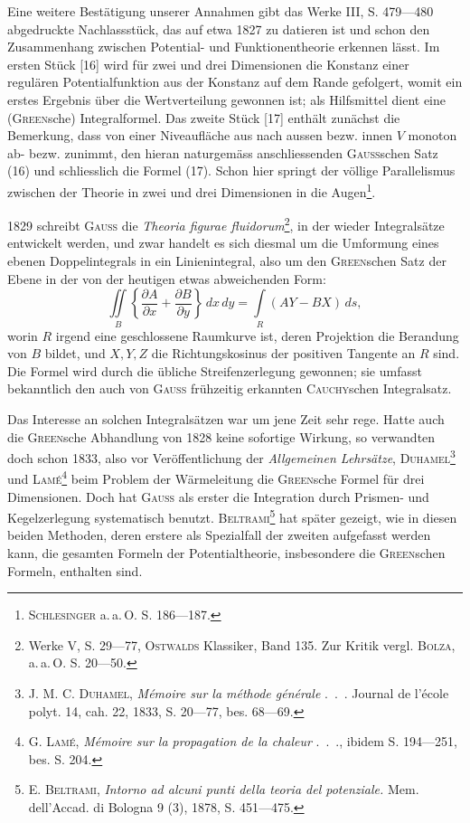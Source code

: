 Eine weitere Bestätigung unserer Annahmen gibt das Werke III, S. 479—480
abgedruckte Nachlassstück, das auf etwa 1827 zu datieren ist und
schon den Zusammenhang zwischen Potential- und Funktionentheorie erkennen
lässt. Im ersten Stück [16] wird für zwei und drei Dimensionen die Konstanz
einer regulären Potentialfunktion aus der Konstanz auf dem Rande gefolgert,
womit ein erstes Ergebnis über die Wertverteilung gewonnen ist; als Hilfsmittel
dient eine (\textsc{Green}sche) Integralformel. Das zweite Stück [17] enthält
zunächst die Bemerkung, dass von einer Niveaufläche aus nach aussen bezw.
innen \(V\) monoton ab- bezw. zunimmt, den hieran naturgemäss anschliessenden
\textsc{Gauss}schen Satz (16) und schliesslich die Formel (17). Schon hier springt
der völlige Parallelismus zwischen der Theorie in zwei und drei Dimensionen
in die Augen\footnote{\textsc{Schlesinger} a.\,a.\,O. S. 186—187.}.

1829 schreibt \textsc{Gauss} die \textit{Theoria figurae fluidorum}\footnote{Werke V, S. 29—77, \textsc{Ostwalds} Klassiker, Band 135. Zur Kritik vergl. \textsc{Bolza}, a.\,a.\,O. S. 20—50.}, in der wieder Integralsätze
entwickelt werden, und zwar handelt es sich diesmal um die Umformung
eines ebenen Doppelintegrals in ein Linienintegral, also um den
\textsc{Green}schen Satz der Ebene in der von der heutigen etwas abweichenden
Form:
\[
\iint\limits_B\left\{\frac{\partial A}{\partial x}+\frac{\partial B}{\partial y}\right\}\,dx\,dy
=\int\limits_R(AY-BX)\,ds,\tag{19}
\]
\noindent worin \(R\) irgend eine geschlossene Raumkurve ist, deren Projektion die
Berandung von \(B\) bildet, und \(X,Y,Z\) die Richtungskosinus der positiven
\clearpage{}
\noindent Tangente an \(R\) sind. Die Formel wird durch die übliche Streifenzerlegung gewonnen;
sie umfasst bekanntlich den auch von \textsc{Gauss} frühzeitig erkannten
\textsc{Cauchy}schen Integralsatz.

Das Interesse an solchen Integralsätzen war um jene Zeit sehr rege.
Hatte auch die \textsc{Green}sche Abhandlung von 1828 keine sofortige Wirkung,
so verwandten doch schon 1833, also vor Veröffentlichung der \textit{Allgemeinen Lehrsätze},
\textsc{Duhamel}\footnote{\textsc{J. M. C. Duhamel}, \textit{Mémoire sur la méthode générale} .\, .\, . Journal de l’école polyt. 14, cah. 22,
1833, S. 20—77, bes. 68—69.} und \textsc{Lamé}\footnote{\textsc{G. Lamé}, \textit{Mémoire sur la propagation de la chaleur} .\, .\, ., ibidem S. 194—251, bes. S. 204.} beim Problem der Wärmeleitung die \textsc{Green}sche
Formel für drei Dimensionen. Doch hat \textsc{Gauss} als erster die Integration
durch Prismen- und Kegelzerlegung systematisch benutzt. \textsc{Beltrami}\footnote{\textsc{E. Beltrami}, \textit{Intorno ad alcuni punti della teoria del potenziale.} Mem. dell’Accad. di Bologna
9 (3), 1878, S. 451—475.} hat
später gezeigt, wie in diesen beiden Methoden, deren erstere als Spezialfall
der zweiten aufgefasst werden kann, die gesamten Formeln der Potentialtheorie,
insbesondere die \textsc{Green}schen Formeln, enthalten sind.

